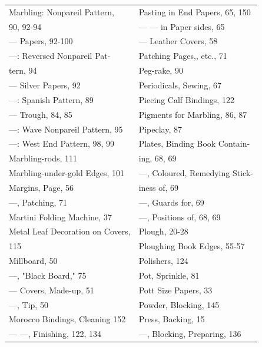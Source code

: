 \documentclass[twoside]{book}
\begin{document}
\begin{center}
\begin{tiny}
\begin{tabular}{l|l}
Marbling: Nonpareil Pattern,        & Pasting in End Papers, 65, 150    \\
    90, 92-94                       & --- --- in Paper sides, 65        \\
--- Papers, 92-100                  & --- Leather Covers, 58            \\
---: Reversed Nonpareil Pat-        & Patching Pages,, etc., 71         \\
    tern, 94                        & Peg-rake, 90                      \\
--- Silver Papers, 92               & Periodicals, Sewing, 67           \\
---: Spanish Pattern, 89            & Piecing Calf Bindings, 122        \\
--- Trough, 84, 85                  & Pigments for Marbling, 86, 87     \\
---: Wave Nonpareil Pattern, 95     & Pipeclay, 87                      \\
---: West End Pattern, 98, 99       & Plates, Binding Book Contain-     \\
Marbling-rods, 111                  &     ing, 68, 69                   \\
Marbling-under-gold Edges, 101      & ---, Coloured, Remedying Stick-   \\
Margins, Page, 56                   &     iness of, 69                  \\
---, Patching, 71                   & ---, Guards for, 69               \\
Martini Folding Machine, 37         & ---, Positions of, 68, 69         \\
Metal Leaf Decoration on Covers,    & Plough, 20-28                     \\
    115                             & Ploughing Book Edges, 55-57       \\
Millboard, 50                       & Polishers, 124                    \\
---, "Black Board," 75              & Pot, Sprinkle, 81                 \\
--- Covers, Made-up, 51             & Pott Size Papers, 33              \\
---, Tip, 50                        & Powder, Blocking, 145             \\
Morocco Bindings, Cleaning 152      & Press, Backing, 15                \\
--- ---, Finishing, 122, 134        & ---, Blocking, Preparing, 136     \\

\end{tabular}
\end{tiny}
\end{center}
\end{document}
